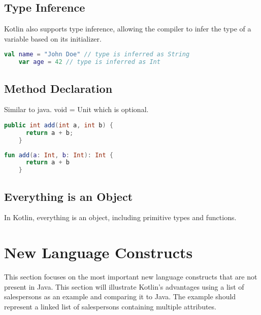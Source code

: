 \documentclass[a4paper, 11pt]{article}
\begin{document}
\subsection{Type Inference}
  Kotlin also supports type inference, allowing the compiler to infer the type of a variable based on its initializer.
  \begin{lstlisting}[language=Kotlin]
    val name = "John Doe" // type is inferred as String
    var age = 42 // type is inferred as Int
  \end{lstlisting}

\subsection{Method Declaration}
  Similar to java. void = Unit which is optional.
  \begin{lstlisting}[language=Java,title={Java method declaration}]
    public int add(int a, int b) {
      return a + b;
    }
  \end{lstlisting}
  \begin{lstlisting}[language=Kotlin,title={Kotlin method declaration}]
    fun add(a: Int, b: Int): Int {
      return a + b
    }
  \end{lstlisting}

\subsection{Everything is an Object}
  In Kotlin, everything is an object, including primitive types and functions.

\section{New Language Constructs}
  This section focuses on the most important new language constructs that are not present in Java. 
  This section will illustrate Kotlin's advantages using a list of salespersons as an example and comparing it to Java.
  The example should represent a linked list of salespersons containing multiple attributes.
\end{document}
